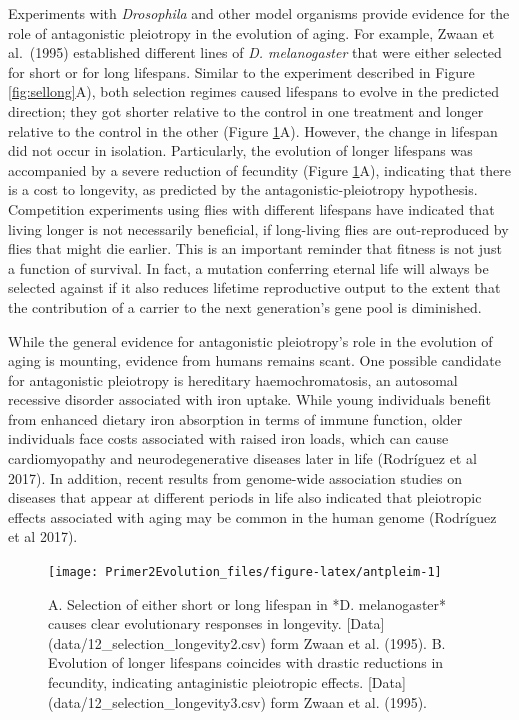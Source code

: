 \documentclass[
]{book}
\begin{document}
Experiments with \emph{Drosophila} and other model organisms provide evidence for the role of antagonistic pleiotropy in the evolution of aging. For example, Zwaan et al.~(1995) established different lines of \emph{D. melanogaster} that were either selected for short or for long lifespans. Similar to the experiment described in Figure \ref{fig:sellong}A), both selection regimes caused lifespans to evolve in the predicted direction; they got shorter relative to the control in one treatment and longer relative to the control in the other (Figure \ref{fig:antpleim}A). However, the change in lifespan did not occur in isolation. Particularly, the evolution of longer lifespans was accompanied by a severe reduction of fecundity (Figure \ref{fig:antpleim}A), indicating that there is a cost to longevity, as predicted by the antagonistic-pleiotropy hypothesis. Competition experiments using flies with different lifespans have indicated that living longer is not necessarily beneficial, if long-living flies are out-reproduced by flies that might die earlier. This is an important reminder that fitness is not just a function of survival. In fact, a mutation conferring eternal life will always be selected against if it also reduces lifetime reproductive output to the extent that the contribution of a carrier to the next generation's gene pool is diminished.

While the general evidence for antagonistic pleiotropy's role in the evolution of aging is mounting, evidence from humans remains scant. One possible candidate for antagonistic pleiotropy is hereditary haemochromatosis, an autosomal recessive disorder associated with iron uptake. While young individuals benefit from enhanced dietary iron absorption in terms of immune function, older individuals face costs associated with raised iron loads, which can cause cardiomyopathy and neurodegenerative diseases later in life (Rodríguez et al 2017). In addition, recent results from genome-wide association studies on diseases that appear at different periods in life also indicated that pleiotropic effects associated with aging may be common in the human genome (Rodríguez et al 2017).

\begin{figure}
\texttt{[image: Primer2Evolution\_files/figure-latex/antpleim-1]} \caption{A. Selection of either short or long lifespan  in *D. melanogaster* causes clear evolutionary responses in longevity. [Data](data/12_selection_longevity2.csv) form Zwaan et al. (1995). B. Evolution of longer lifespans coincides with drastic reductions in fecundity, indicating antaginistic pleiotropic effects. [Data](data/12_selection_longevity3.csv) form Zwaan et al. (1995).}\label{fig:antpleim}
\end{figure}
\end{document}

